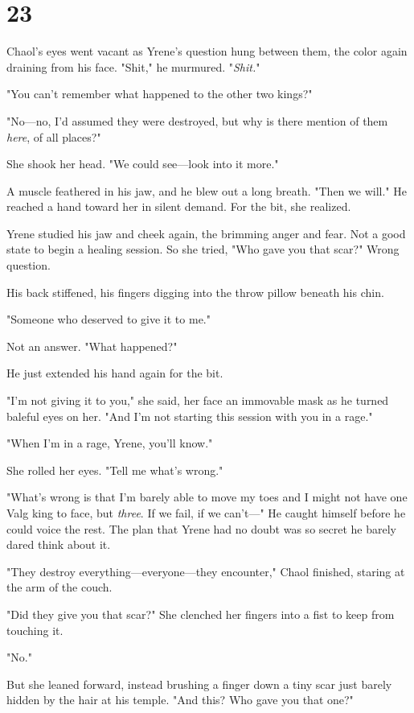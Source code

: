 
\chapter{23}

Chaol's eyes went vacant as Yrene's question hung between them, the color again draining from his face. "Shit," he murmured. "\emph{Shit.}"

"You can't remember what happened to the other two kings?"

"No---no, I'd assumed they were destroyed, but  why is there mention of them \emph{here}, of all places?"

She shook her head. "We could see---look into it more."

A muscle feathered in his jaw, and he blew out a long breath. "Then we will." He reached a hand toward her in silent demand. For the bit, she realized.

Yrene studied his jaw and cheek again, the brimming anger and fear. Not a good state to begin a healing session. So she tried, "Who gave you that scar?" Wrong question.

His back stiffened, his fingers digging into the throw pillow beneath his chin.

"Someone who deserved to give it to me."

Not an answer. "What happened?"

He just extended his hand again for the bit.

"I'm not giving it to you," she said, her face an immovable mask as he turned baleful eyes on her. "And I'm not starting this session with you in a rage."

"When I'm in a rage, Yrene, you'll know."

She rolled her eyes. "Tell me what's wrong."

"What's wrong is that I'm barely able to move my toes and I might not have one Valg king to face, but \emph{three}. If we fail, if we can't---" He caught himself before he could voice the rest. The plan that Yrene had no doubt was so secret he barely dared think about it.

"They destroy everything---everyone---they encounter," Chaol finished, staring at the arm of the couch.

"Did they give you that scar?" She clenched her fingers into a fist to keep from touching it.

"No."

But she leaned forward, instead brushing a finger down a tiny scar just barely hidden by the hair at his temple. "And this? Who gave you that one?"

